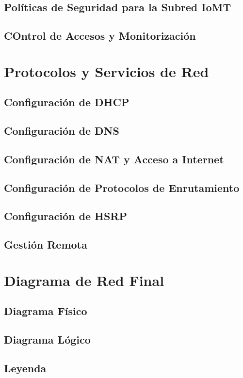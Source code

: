 \subsection{Políticas de Seguridad para la Subred IoMT}

\subsection{COntrol de Accesos y Monitorización}

\section{Protocolos y Servicios de Red}

\subsection{Configuración de DHCP}

\subsection{Configuración de DNS}

\subsection{Configuración de NAT y Acceso a Internet}

\subsection{Configuración de Protocolos de Enrutamiento}

\subsection{Configuración de HSRP}

\subsection{Gestión Remota}

\section{Diagrama de Red Final}

\subsection{Diagrama Físico}

\subsection{Diagrama Lógico}

\subsection{Leyenda}